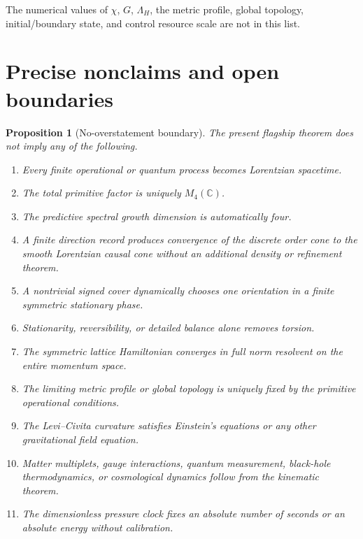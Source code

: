 \documentclass[11pt]{article}
\newtheorem{proposition}[theorem]{Proposition}
\theoremstyle{definition}
\theoremstyle{remark}
\newcommand{\C}{\mathbb C}
\begin{document}
The numerical values of $\chi$, $G$, $\Lambda_H$, the metric profile, global
topology, initial/boundary state, and control resource scale are not in this
list.

\section{Precise nonclaims and open boundaries}

\begin{proposition}[No-overstatement boundary]
\label{prop:no-overstatement}
The present flagship theorem does not imply any of the following.
\begin{enumerate}[label=\textup{(\arabic*)},leftmargin=2.7em]
\item Every finite operational or quantum process becomes Lorentzian spacetime.
\item The total primitive factor is uniquely $M_4(\C)$.
\item The predictive spectral growth dimension is automatically four.
\item A finite direction record produces convergence of the discrete order cone
      to the smooth Lorentzian causal cone without an additional density or
      refinement theorem.
\item A nontrivial signed cover dynamically chooses one orientation in a finite
      symmetric stationary phase.
\item Stationarity, reversibility, or detailed balance alone removes torsion.
\item The symmetric lattice Hamiltonian converges in full norm resolvent on the
      entire momentum space.
\item The limiting metric profile or global topology is uniquely fixed by the
      primitive operational conditions.
\item The Levi--Civita curvature satisfies Einstein's equations or any other
      gravitational field equation.
\item Matter multiplets, gauge interactions, quantum measurement, black-hole
      thermodynamics, or cosmological dynamics follow from the kinematic theorem.
\item The dimensionless pressure clock fixes an absolute number of seconds or
      an absolute energy without calibration.
\end{enumerate}
\end{proposition}
\end{document}
